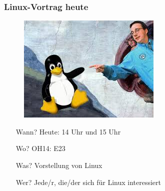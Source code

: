 \documentclass{beamer}
\begin{document}
\begin{frame}
\frametitle{Linux-Vortrag heute}
\begin{figure}
\includegraphics[scale=0.7]{tuxlinus.jpeg}
\end{figure}
\begin{itemize}
		\item[Wann?] Heute: 14 Uhr und 15 Uhr
		\item[Wo?] OH14: E23
		\item[Was?] Vorstellung von Linux
		\item[Wer?] Jede/r, die/der sich für Linux interessiert
\end{itemize}
\end{frame}
\end{document}
